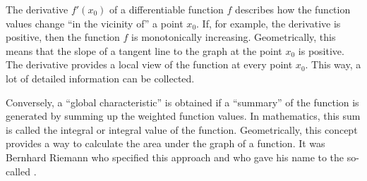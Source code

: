 \begin{MIntro}

The derivative $f'(x_0)$ of a differentiable function $f$ describes 
how the function values change ``in the vicinity of'' a point $x_0$. 
If, for example, the derivative is positive, then the function $f$ is 
monotonically increasing. Geometrically, this means that the slope of a tangent 
line to the graph at the point $x_0$ is positive. The derivative provides 
a local view of the function at every point $x_0$. This way, a lot of 
detailed information can be collected.

Conversely, a ``global characteristic'' is obtained if a ``summary'' 
of the function is generated by summing up the weighted function values. In mathematics, 
this sum is called the integral or integral value of the function. Geometrically, 
this concept provides a way to calculate the area under the graph of a function. 
It was Bernhard Riemann who specified this approach and who gave his name to the 
so-called .
\end{MIntro}


